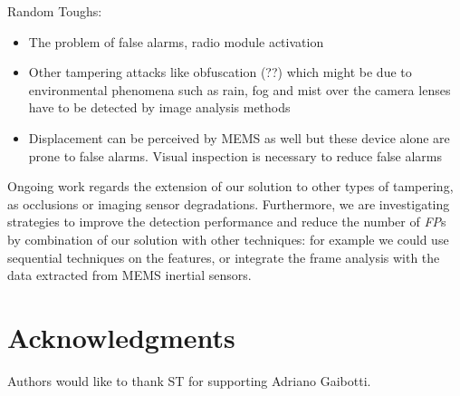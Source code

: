 \documentclass{llncs}
\begin{document}
Random Toughs:
\begin{itemize}
\item The problem of false alarms, radio module activation
\item Other tampering attacks like obfuscation (??) which might be due to environmental phenomena such as rain, fog and mist over the camera lenses have to be detected by image analysis methods
\item Displacement can be perceived by MEMS as well but these device alone are prone to false alarms. Visual inspection is necessary to reduce false alarms
\end{itemize}
Ongoing work regards the extension of our solution to other types of tampering, as occlusions or imaging sensor degradations.
Furthermore, we are investigating strategies to improve the detection performance and reduce the number of \textit{FP}s by combination of our solution with other techniques:
for example we could use sequential techniques on the features, or integrate the frame analysis with the data extracted from MEMS inertial sensors.   

\section*{Acknowledgments}\label{sec:Acknowledgments}
Authors would like to thank ST for supporting Adriano Gaibotti.




%	
%	
\end{document}
